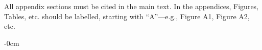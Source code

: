 \documentclass[cryptography,review,submit,pdftex,moreauthors,amsmath,amssymb,aps,strict]{Definitions/mdpi}
\begin{document}
\section[\appendixname~\thesection]{}
All appendix sections must be cited in the main text. In the appendices, Figures, Tables, etc. should be labelled, starting with ``A''---e.g., Figure A1, Figure A2, etc.

\begin{adjustwidth}{-\extralength}{0cm}






%


\PublishersNote{}
\end{adjustwidth}
\end{document}
